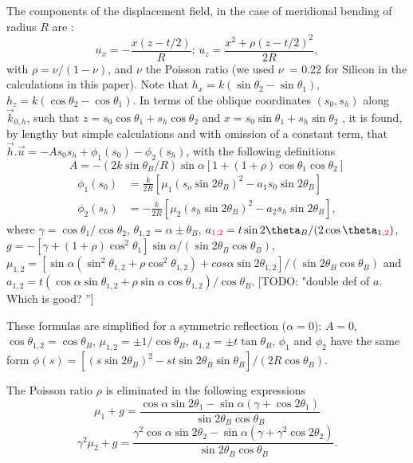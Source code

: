 \documentclass[preprint]{iucr}              %
\newcommand{\todo}[1]{{\color{red}[TODO: "#1'']}}
\newcommand{\inred}[1]{{\color{red}#1}}
\begin{document}
The components of the displacement field, in the case of meridional bending of radius $R$ are \cite{Nesterets}:
\begin{equation}
    u_x = -\frac{x(z-t/2)}{R}; \, u_z=\frac{x^2+\rho(z-t/2)^2}{2R},
\end{equation}
with $\rho=\nu/(1-\nu)$, and $\nu$ the Poisson ratio (we used $\nu$~= 0.22 for Silicon in the calculations in this paper). 
Note that $h_x=k(\sin\theta_2-\sin\theta_1)$, $h_z=k(\cos\theta_2-\cos\theta_1)$.
In terms of the oblique coordinates $(s_0,s_h)$ along $\vec k_{0,h}$, such that $z=s_0\cos\theta_1 + s_h \cos\theta_2$ and $x=s_0 \sin\theta_1+s_h\sin\theta_2$ , 
it is found, by lengthy but simple calculations and with omission of a constant term, that $\vec h.\vec u=-A s_0 s_h + \phi_1(s_0) -\phi_2(s_h)$,  
with the following definitions
\begin{equation}
    A = -(2 k \sin\theta_B /R)\sin\alpha[1+(1+\rho)\cos\theta_1\cos\theta_2]
\end{equation}
\begin{align}
    \phi_1(s_0) &= \frac{k}{2R}[\mu_1(s_o\sin2\theta_B)^2-a_1 s_0\sin2\theta_B] \nonumber \\
    \phi_2(s_h) &= -\frac{k}{2R}[\mu_2(s_h\sin2\theta_B)^2-a_2 s_h\sin2\theta_B],
\end{align}
where $\gamma=\cos\theta_1/\cos\theta_2$, $\theta_{1,2}=\alpha\pm \theta_B$,
$a_{\inred{1,2}}=t \sin2\theta_B / (2\cos\theta_{1\inred{,2}})$, 
$g= -[\gamma +(1+\rho)\cos^2\theta_1]\sin\alpha/(\sin2\theta_B\cos\theta_B)$,
$\mu_{1,2}=[\sin\alpha(\sin^2\theta_{1,2}+\rho\cos^2\theta_{1,2})+cos\alpha\sin2\theta_{1,2}]/(\sin2\theta_B\cos\theta_B)$ and
$a_{1,2}=t(\cos\alpha\sin\theta_{1,2}+\rho\sin\alpha\cos\theta_{1,2})/\cos\theta_B$. \todo{double def of $a$. Which is good? }


These formulas are simplified for a symmetric reflection ($\alpha=0$):
$A=0$, $\cos\theta_{1,2}=\cos\theta_B$, $\mu_{1,2}=\pm1/\cos\theta_B$, $a_{1,2}=\pm t\tan\theta_B$, $\phi_1$ and  $\phi_2$ have the same form $\phi(s)=[(s\sin2\theta_B)^2-s t \sin2\theta_B\sin\theta_B] / (2 R \cos\theta_B)$. 

The Poisson ratio $\rho$ is eliminated in the following expressions 
\begin{equation}
    \mu_1+g=\frac{\cos\alpha\sin2\theta_1-\sin\alpha(\gamma+\cos2\theta_1)}{\sin2\theta_B\cos\theta_B}
\end{equation}
\begin{equation}
    \gamma^2\mu_2+g=\frac{\gamma^2\cos\alpha\sin2\theta_2-\sin\alpha(\gamma+\gamma^2\cos2\theta_2)}{\sin2\theta_B\cos\theta_B}.
\end{equation}
\end{document}
